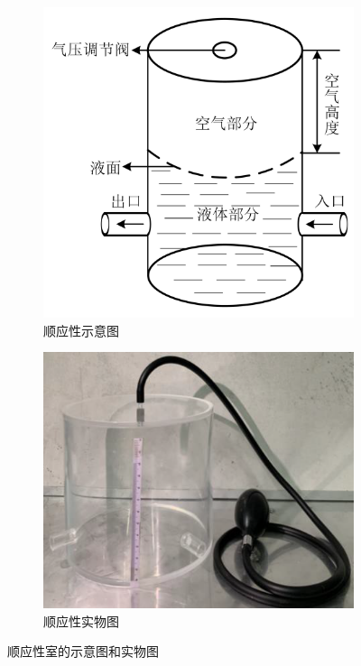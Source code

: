 \documentclass[titlepage,12pt]{article}
\begin{document}
\begin{figure}[htbp]
    \centering
    \begin{subfigure}[b]{0.40\textwidth}
        \centering
        \includegraphics[width=\textwidth]{figures/顺应性示意图.png}
        \caption{顺应性示意图}
        \label{fig:compliance_diagram}
    \end{subfigure}
    \hfill
    \begin{subfigure}[b]{0.45\textwidth}
        \centering
        \includegraphics[width=\textwidth]{figures/顺应性实物图.png}
        \caption{顺应性实物图}
        \label{fig:compliance_real}
    \end{subfigure}
    \caption{顺应性室的示意图和实物图}
\end{figure}
\end{document}
